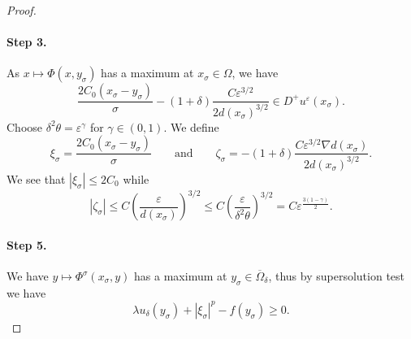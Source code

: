 \documentclass[11pt,reqno]{amsart}
\numberwithin{figure}{section}
\theoremstyle{plain}
\theoremstyle{remark}
\numberwithin{equation}{section}
\begin{document}
\begin{proof}
\paragraph{Step 3.} As $x\mapsto \Phi(x,y_\sigma)$ has a maximum at $x_\sigma \in \Omega$, we have
\begin{equation*}
    \frac{2C_0(x_\sigma - y_\sigma)}{\sigma} - \left(1+\delta\right)\frac{C\varepsilon^{3/2}}{2d(x_\sigma)^{3/2}} \in D^+u^\varepsilon(x_\sigma).
\end{equation*}
Choose $\delta^2\theta = \varepsilon^\gamma$ for $\gamma \in (0,1)$. We define
\begin{equation*}
    \xi_\sigma = \frac{2C_0(x_\sigma - y_\sigma)}{\sigma} \qquad\text{and}\qquad \zeta_\sigma =-(1+\delta)\frac{C\varepsilon^{3/2}\nabla d(x_\sigma)}{2d(x_\sigma)^{3/2}}.
\end{equation*}
We see that $|\xi_\sigma|\leq 2C_0$ while
\begin{equation*}
    |\zeta_\sigma| \leq C\left(\frac{\varepsilon}{d(x_\sigma)}\right)^{3/2} \leq  C\left(\frac{\varepsilon}{\delta^2\theta}\right)^{3/2} = C\varepsilon^{\frac{3(1-\gamma)}{2}}.
\end{equation*}


\paragraph{Step 5.} We have $y\mapsto \Phi^\sigma(x_\sigma,y)$ has a maximum at $y_\sigma\in \overline{\Omega}_\delta$, thus by supersolution test we have 
\begin{equation}\label{e:super1}
    \lambda u_\delta(y_\sigma) + \left|\xi_\sigma\right|^p - f(y_\sigma) \geq 0.
\end{equation}

\end{proof}
\end{document}
